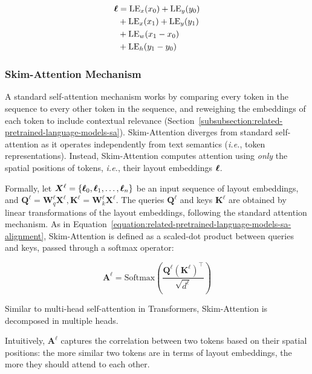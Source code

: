 \begin{equation}
\begin{split}
    \boldsymbol{\ell} & = \text{LE}_x(x_0) + \text{LE}_y(y_0) \\
    & + \text{LE}_x(x_1) + \text{LE}_y(y_1) \\
    & + \text{LE}_w(x_1 - x_0) \\
    & + \text{LE}_h(y_1 - y_0) \\
\end{split}
\end{equation}

\subsubsection{Skim-Attention Mechanism}

A standard self-attention mechanism works by comparing every token in the sequence to every other token in the sequence, and reweighing the embeddings of each token to include contextual relevance (Section~\ref{subsubsection:related-pretrained-language-models-sa}). Skim-Attention diverges from standard self-attention as it operates independently from text semantics (\textit{i.e.}, token representations). Instead, Skim-Attention computes attention using \emph{only} the spatial positions of tokens, \textit{i.e.}, their layout embeddings $\boldsymbol{\ell}$.

Formally, let $\bm{X}^{\ell} =  \{\boldsymbol{\ell}_0, \boldsymbol{\ell}_1, \ldots, \boldsymbol{\ell}_n\}$ be an input sequence of layout embeddings, and $\bm{Q}^{\ell} = \bm{W}^{\ell}_q \bm{X}^{\ell}, \bm{K}^{\ell} =  \bm{W}^{\ell}_k \bm{X}^{\ell}$. The queries $\bm{Q}^{\ell}$ and keys $\bm{K}^{\ell}$ are obtained by linear transformations of the layout embeddings, following the standard attention mechanism. As in Equation~\ref{equation:related-pretrained-language-models-sa-alignment}, Skim-Attention is defined as a scaled-dot product between queries and keys, passed through a softmax operator:

\begin{equation}
\label{eq:skim-attention-matrix}
    \bm{A}^{\ell} = \text{Softmax}\left(\dfrac{\bm{Q}^{\ell}\left(\bm{K}^{\ell}\right)^\top}{\sqrt{d^{\ell}}}\right)
\end{equation}

\noindent Similar to multi-head self-attention in Transformers, Skim-Attention is decomposed in multiple heads.

Intuitively, $\bm{A}^{\ell}$ captures the correlation between two tokens based on their spatial positions: the more similar two tokens are in terms of layout embeddings, the more they should attend to each other. 

